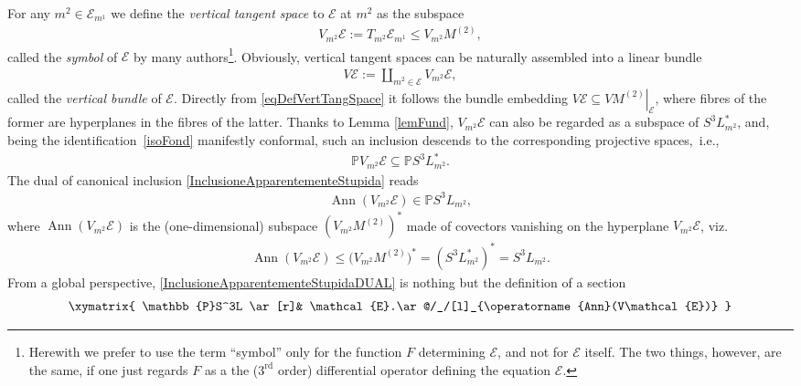 \documentclass[10pt,a4paper]{amsart}
\newcommand{\E}{\mathcal{E}}
\newcommand{\Ann}{\operatorname{Ann}}
\renewcommand{\P}{\mathbb{P}}
\newcommand{\Rd}{^\textrm{rd}}
\numberwithin{equation}{section}
\begin{document}
For any $m^2\in \E_{m^1}$ we def\/ine the \emph{vertical tangent space} to $\E$ at $m^2$ as the subspace
\begin{gather}\label{eqDefVertTangSpace}
V_{m^2}\E:=T_{m^2}\E_{m^1}\leq V_{m^2}M^{(2)},
\end{gather}
called the \emph{symbol} of $\E$ by many authors\footnote{Herewith we prefer to use the term ``symbol'' only for the function $F$ determining $\E$, and not for $\E$ itself. The two things, however, are the same, if one just regards $F$ as a the ($3\Rd$ order) dif\/ferential operator def\/ining the equation $\E$.}. Obviously, vertical tangent spaces can be naturally assembled into a linear bundle
\begin{gather*}%
V\E:=\coprod_{m^2\in \E}V_{m^2}\E,
\end{gather*}
called  the \emph{vertical bundle} of $\E$. Directly from \eqref{eqDefVertTangSpace} it follows the bundle embedding $V\E\subseteq \left.VM^{(2)}\right|_\E$,
where f\/ibres of the former are hyperplanes in the f\/ibres of the latter. Thanks to Lemma \ref{lemFund}, $V_{m^2}\E$ can also be regarded as a subspace of $S^3L_{m^2}^\ast$, and, being the identif\/ica\-tion~\eqref{isoFond} manifestly conformal, such an inclusion descends to the corresponding projective spaces,~i.e.,
\begin{gather}\label{InclusioneApparentementeStupida}
\P V_{m^2}\E \subseteq \P S^3L_{m^2}^\ast.
\end{gather}
The dual of canonical inclusion \eqref{InclusioneApparentementeStupida} reads
\begin{gather}\label{InclusioneApparentementeStupidaDUAL}
\Ann(V_{m^2}\E ) \in \P S^3L_{m^2},
\end{gather}
where $\Ann(V_{m^2}\E )$ is the (one-dimensional) subspace $\left(V_{m^2}M^{(2)}\right)^*$ made of covectors vanishing on the hyperplane $V_{m^2}\E $, viz.
\begin{gather}\label{eqComeSiDEfinisceIlSimbolo}
\Ann(V_{m^2}\E )\leq \big(V_{m^2}M^{(2)}\big)^*=(S^3L_{m^2}^\ast)^\ast=S^3L_{m^2}.
\end{gather}
From a global perspective, \eqref{InclusioneApparentementeStupidaDUAL} is nothing but the def\/inition of a section
\begin{gather}\label{secSymE}
\xymatrix{
\P S^3L \ar[r]& \E.\ar@/_/[l]_{\Ann(V\E )}
}
\end{gather}
\end{document}
